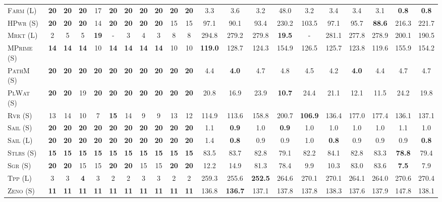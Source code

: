 \begin{table}[tb]
{\begin{tabular}{|l||cccccccccc||cccccccccc||}
\textsc{Farm} (L)&\textbf{20}&\textbf{20}&\textbf{20}&17&\textbf{20}&\textbf{20}&\textbf{20}&\textbf{20}&\textbf{20}&\textbf{20}&3.3&3.6&3.2&48.0&3.2&3.4&3.4&3.1&\textbf{0.8}&\textbf{0.8}\\
\textsc{HPwr} (S)&\textbf{20}&\textbf{20}&\textbf{20}&14&\textbf{20}&\textbf{20}&\textbf{20}&\textbf{20}&15&15&97.1&90.1&93.4&230.2&103.5&97.1&95.7&\textbf{88.6}&216.3&221.7\\
\textsc{Mrkt} (L)&2&5&5&\textbf{19}&-&3&4&3&8&8&294.8&279.2&279.8&\textbf{19.5}&-&281.1&277.8&278.9&200.1&190.5\\
\textsc{MPrime} (S)&\textbf{14}&\textbf{14}&\textbf{14}&10&\textbf{14}&\textbf{14}&\textbf{14}&\textbf{14}&10&10&\textbf{119.0}&128.7&124.3&154.9&126.5&125.7&123.8&119.6&155.9&154.2\\
\textsc{PathM} (S)&\textbf{20}&\textbf{20}&\textbf{20}&\textbf{20}&\textbf{20}&\textbf{20}&\textbf{20}&\textbf{20}&\textbf{20}&\textbf{20}&4.4&\textbf{4.0}&4.7&4.8&4.5&4.2&\textbf{4.0}&4.4&4.7&4.7\\
\textsc{PlWat} (S)&\textbf{20}&\textbf{20}&19&\textbf{20}&\textbf{20}&\textbf{20}&\textbf{20}&\textbf{20}&\textbf{20}&\textbf{20}&20.8&16.9&23.9&\textbf{10.7}&24.4&21.1&12.1&11.5&24.2&19.8\\
\textsc{Rvr} (S)&13&14&10&7&\textbf{15}&14&9&9&13&12&114.9&113.6&158.8&200.7&\textbf{106.9}&136.4&177.0&177.4&136.1&137.1\\
\textsc{Sail} (S)&\textbf{20}&\textbf{20}&\textbf{20}&\textbf{20}&\textbf{20}&\textbf{20}&\textbf{20}&\textbf{20}&\textbf{20}&\textbf{20}&1.1&\textbf{0.9}&1.0&\textbf{0.9}&1.0&1.0&1.0&1.0&1.1&1.0\\
\textsc{Sail} (L)&\textbf{20}&\textbf{20}&\textbf{20}&\textbf{20}&\textbf{20}&\textbf{20}&\textbf{20}&\textbf{20}&\textbf{20}&\textbf{20}&1.4&\textbf{0.8}&0.9&0.9&1.0&\textbf{0.8}&0.9&0.9&0.9&\textbf{0.8}\\
\textsc{Stlrs} (S)&\textbf{15}&\textbf{15}&\textbf{15}&\textbf{15}&\textbf{15}&\textbf{15}&\textbf{15}&\textbf{15}&\textbf{15}&\textbf{15}&83.5&83.7&82.8&79.1&82.2&84.1&82.8&83.3&\textbf{78.8}&79.4\\
\textsc{Sgr} (S)&\textbf{20}&\textbf{20}&15&15&\textbf{20}&\textbf{20}&15&15&\textbf{20}&\textbf{20}&12.2&14.9&81.3&78.4&9.9&10.3&83.0&83.6&\textbf{7.5}&7.9\\
\textsc{Tpp} (L)&3&3&\textbf{4}&3&2&2&3&3&2&2&259.3&255.6&\textbf{252.5}&264.6&270.1&270.1&264.1&264.0&270.6&270.4\\
\textsc{Zeno} (S)&\textbf{11}&\textbf{11}&\textbf{11}&\textbf{11}&\textbf{11}&\textbf{11}&\textbf{11}&\textbf{11}&\textbf{11}&\textbf{11}&136.8&\textbf{136.7}&137.1&137.8&137.8&138.3&137.6&137.9&147.8&138.1\\

\end{tabular}}
\end{table}
